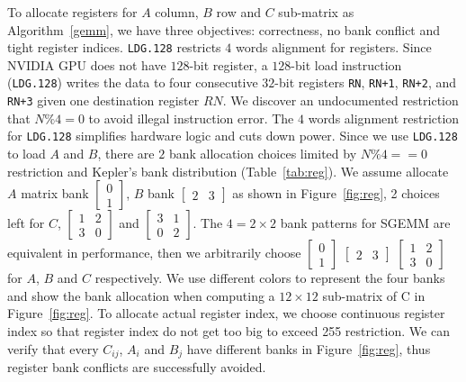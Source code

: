 To allocate registers for $A$ column, $B$ row and $C$ sub-matrix as Algorithm~\ref{gemm}, we have three objectives: correctness, no bank conflict and tight register indices.
{\tt LDG.128} restricts $4$ words alignment for registers.
Since NVIDIA GPU does not have $128$-bit register, a $128$-bit load instruction ({\tt LDG.128}) writes the data to four consecutive $32$-bit registers {\tt RN}, {\tt RN+1}, {\tt RN+2}, and {\tt RN+3} given one destination register $RN$.
We discover an undocumented restriction that $N\%4=0$ to avoid illegal instruction error.
The $4$ words alignment restriction for {\tt LDG.128} simplifies hardware logic and cuts down power.
Since we use {\tt LDG.128} to load $A$ and $B$, there are $2$ bank allocation choices limited by $N\%4==0$ restriction and Kepler's bank distribution (Table~\ref{tab:reg}).
We assume allocate $A$ matrix bank $\begin{bmatrix} 0 \\ 1  \end{bmatrix}$,
    $B$ bank $\begin{bmatrix} 2 & 3 \end{bmatrix}$ as shown in Figure~\ref{fig:reg}, 2 choices left for $C$,
$\begin{bmatrix} 1 & 2 \\ 3 & 0  \end{bmatrix}$ and
$\begin{bmatrix} 3 & 1 \\ 0 & 2  \end{bmatrix}$.
The $4=2\times2$ bank patterns for SGEMM are equivalent in performance, then we arbitrarily
choose $\begin{bmatrix} 0 \\ 1  \end{bmatrix}$ $\begin{bmatrix} 2 & 3 \end{bmatrix}$
    $\begin{bmatrix} 1 & 2 \\ 3 & 0  \end{bmatrix}$ for $A$, $B$ and $C$ respectively.
We use different colors to represent the four banks and show the bank allocation when computing a $12 \times 12$ sub-matrix of C in Figure~\ref{fig:reg}.
To allocate actual register index, we choose continuous register index so that register index do not get too big to exceed 255 restriction. 
We can verify that every $C_{ij}$, $A_i$ and $B_j$ have different banks in Figure~\ref{fig:reg}, thus register bank conflicts are successfully avoided.

